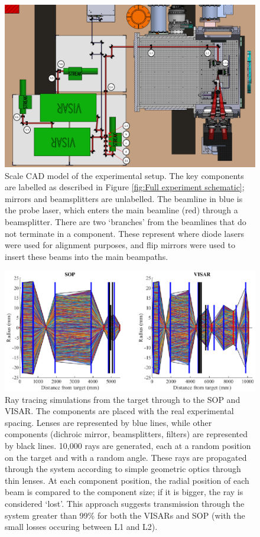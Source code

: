 \begin{figure}
	\centering
	\includegraphics[width=1.0\textwidth]{figures/Experiment/OriginalCad.pdf}%
	\caption{\label{fig:Original CAD} Scale CAD model of the experimental setup. The key components are labelled as described in Figure \ref{fig:Full experiment schematic}; mirrors and beamsplitters are unlabelled. The beamline in blue is the probe laser, which enters the main beamline (red) through a beamsplitter. There are two `branches' from the beamlines that do not terminate in a component. These represent where diode lasers were used for alignment purposes, and flip mirrors were used to insert these beams into the main beampaths.}
\end{figure}

\begin{figure}
	\centering
\includegraphics[width=1.0\textwidth]{figures/Experiment/RayTracing.eps}%
\caption{\label{fig:Ray trace} Ray tracing simulations from the target through to the SOP and VISAR. The components are placed with the real experimental spacing. Lenses are represented by blue lines, while other components (dichroic mirror, beamsplitters, filters) are represented by black lines. 10,000 rays are generated, each at a random position on the target and with a random angle. These rays are propagated through the system according to simple geometric optics through thin lenses. At each component position, the radial position of each beam is compared to the component size; if it is bigger, the ray is considered `lost'. This approach suggests transmission through the system greater than 99\% for both the VISARs and SOP (with the small losses occuring between L1 and L2).}
\end{figure}

